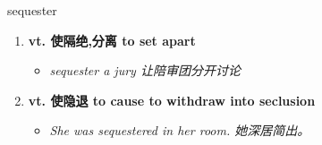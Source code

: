 
\begin{frame}
{\huge sequester}
\begin{center}
\begin{enumerate}\Large
  \item \textbf{vt. 使隔绝,分离 to set apart}
  \begin{itemize}
    \item \em{\Large{sequester a jury 让陪审团分开讨论}}
  \end{itemize}
  \item \textbf{vt. 使隐退 to cause to withdraw into seclusion}
  \begin{itemize}
    \item \em{\Large{She was sequestered in her room. 她深居简出。}}
  \end{itemize}
\end{enumerate}
\end{center}
\end{frame}
